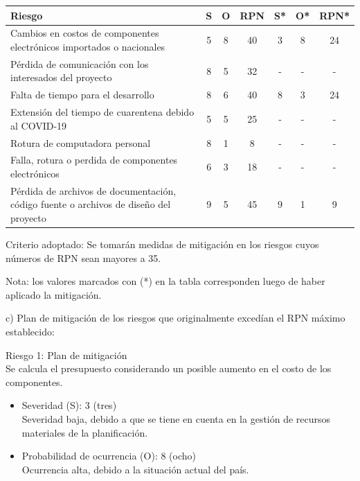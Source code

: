 \documentclass[11pt]{charter}
\begin{document}
\begin{table}[htpb]
\centering
\begin{tabularx}{\linewidth}{@{}|X|c|c|c|c|c|c|@{}}
\hline
\rowcolor[HTML]{C0C0C0} 
Riesgo & S & O & RPN & S* & O* & RPN* \\ \hline
Cambios en costos de componentes electrónicos importados o nacionales                  & 5 & 8 & 40 &  3 &  8 & 24   \\ \hline
Pérdida de comunicación con los interesados del proyecto                               & 8 & 5 & 32 &  - &  - & -    \\ \hline
Falta de tiempo para el desarrollo                                                     & 8 & 6 & 40 &  8 &  3 & 24   \\ \hline
Extensión del tiempo de cuarentena debido al COVID-19                                  & 5 & 5 & 25 &  - &  - & -    \\ \hline
Rotura de computadora personal                                                         & 8 & 1 &  8 &  - &  - & -    \\ \hline
Falla, rotura o perdida de componentes electrónicos                                    & 6 & 3 & 18 &  - &  - & -    \\ \hline
Pérdida de archivos de documentación, código fuente o archivos de diseño del proyecto  & 9 & 5 & 45 &  9 &  1 & 9    \\ \hline
\end{tabularx}%
\end{table}

Criterio adoptado: 
Se tomarán medidas de mitigación en los riesgos cuyos números de RPN sean mayores a 35.

Nota: los valores marcados con (*) en la tabla corresponden luego de haber aplicado la mitigación.

c) Plan de mitigación de los riesgos que originalmente excedían el RPN máximo establecido:

Riesgo 1: Plan de mitigación \\
Se calcula el presupuesto considerando un posible aumento en el costo de los componentes.
\begin{itemize}
\item Severidad (S): 3 (tres) \\
Severidad baja, debido a que se tiene en cuenta en la gestión de recursos materiales de la planificación.
\item Probabilidad de ocurrencia (O): 8 (ocho) \\
Ocurrencia alta, debido a la situación actual del país. 
\end{itemize}
\end{document}
